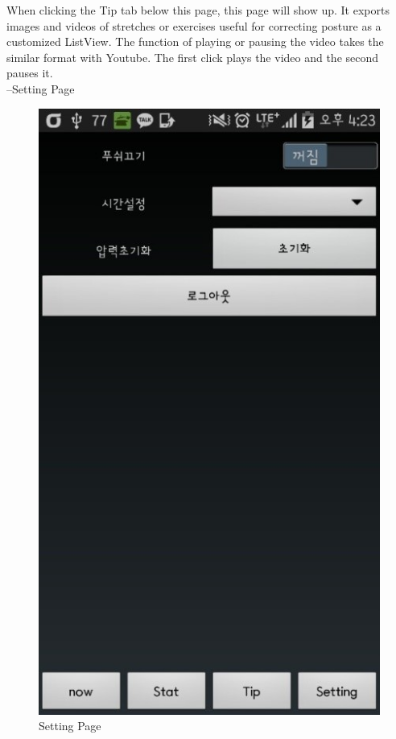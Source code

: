 \documentclass[conference]{IEEEtran}
\begin{document}
When clicking the Tip tab below this page, this page will show up. It exports images and videos of stretches or exercises useful for correcting posture as a customized ListView. The function of playing or pausing the video takes the similar format with Youtube. The first click plays the video and the second pauses it.\\

 --Setting Page

\begin{figure}[htbp]
\begin{center}
    \includegraphics[scale=1]{img_15}
    \caption{Setting Page} 
\end{center}
\end{figure}
\end{document}
